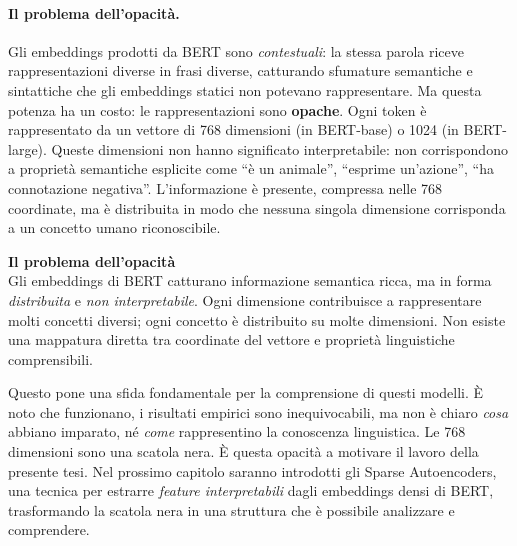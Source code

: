 \paragraph{Il problema dell'opacità.}
Gli embeddings prodotti da BERT sono \textit{contestuali}: la stessa parola riceve rappresentazioni diverse in frasi diverse, catturando sfumature semantiche e sintattiche che gli embeddings statici non potevano rappresentare. Ma questa potenza ha un costo: le rappresentazioni sono \textbf{opache}.
Ogni token è rappresentato da un vettore di 768 dimensioni (in BERT-base) o 1024 (in BERT-large). Queste dimensioni non hanno significato interpretabile: non corrispondono a proprietà semantiche esplicite come ``è un animale'', ``esprime un'azione'', ``ha connotazione negativa''. L'informazione è presente, compressa nelle 768 coordinate, ma è distribuita in modo che nessuna singola dimensione corrisponda a un concetto umano riconoscibile.
\begin{notebox}
\textbf{Il problema dell'opacità}\\
Gli embeddings di BERT catturano informazione semantica ricca, ma in forma \textit{distribuita} e \textit{non interpretabile}. Ogni dimensione contribuisce a rappresentare molti concetti diversi; ogni concetto è distribuito su molte dimensioni. Non esiste una mappatura diretta tra coordinate del vettore e proprietà linguistiche comprensibili.
\end{notebox}
Questo pone una sfida fondamentale per la comprensione di questi modelli. È noto che funzionano, i risultati empirici sono inequivocabili, ma non è chiaro \textit{cosa} abbiano imparato, né \textit{come} rappresentino la conoscenza linguistica. Le 768 dimensioni sono una scatola nera.
È questa opacità a motivare il lavoro della presente tesi. Nel prossimo capitolo saranno introdotti gli Sparse Autoencoders, una tecnica per estrarre \textit{feature interpretabili} dagli embeddings densi di BERT, trasformando la scatola nera in una struttura che è possibile analizzare e comprendere.